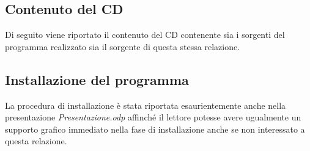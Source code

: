 \documentclass[paper=a4, oneside, fontsize=14pt, titlepage]{article}
\begin{document}
		\subsection{Contenuto del CD}
			\begin{flushleft}
				Di seguito viene riportato il contenuto del CD contenente sia i sorgenti del programma realizzato sia il sorgente di questa stessa relazione.
			\end{flushleft}
			
		\subsection{Installazione del programma}
			\begin{flushleft}
				La procedura di installazione è stata riportata esaurientemente anche nella presentazione \textit{Presentazione.odp} affinché il lettore potesse avere ugualmente un supporto grafico immediato nella fase di installazione anche se non interessato a questa relazione.\newline
				
				
			\end{flushleft}
\end{document}
